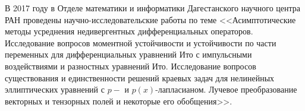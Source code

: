 \Conclusion

В 2017 году в Отделе математики и информатики Дагестанского научного центра РАН проведены научно-исследовательские работы по теме
<<Асимптотические методы усреднения недивергентных дифференциальных операторов. Исследование вопросов моментной устойчивости и устойчивости по части переменных для дифференциальных уравнений Ито с импульсными воздействиями и разностных уравнений Ито. Исследование вопросов существования и единственности решений краевых задач для нелинейных эллиптических уравнений с $p-$ и $p(x)$-лапласианом. Лучевое преобразование векторных и тензорных полей и некоторые его обобщения>>.








